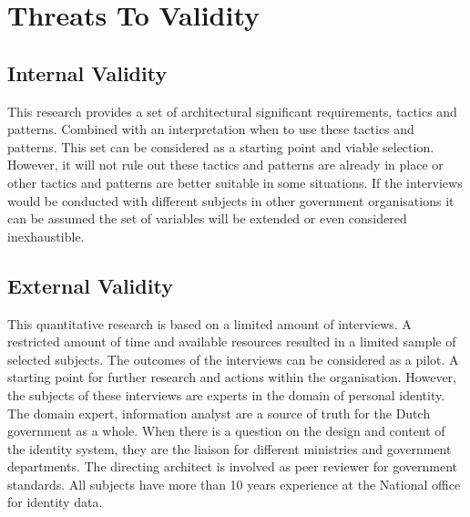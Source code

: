 \chapter{Threats To Validity}\label{sec:threats}


\section{Internal Validity}
This research provides a set of architectural significant requirements, tactics and patterns. Combined with an interpretation when to use these tactics and patterns.
This set can be considered as a starting point and viable selection. However, it will not rule out these tactics and patterns are already in place or other tactics and patterns are better suitable in some situations. If the interviews would be conducted with different subjects in other government organisations it can be assumed the set of variables will be extended or even considered inexhaustible. 

\section{External Validity}
This quantitative research is based on a limited amount of interviews. A restricted amount of time and available resources resulted in a limited sample of selected subjects. The outcomes of the interviews can be considered as a pilot. A starting point for further research and actions within the organisation. 
However, the subjects of these interviews are experts in the domain of personal identity. The domain expert, information analyst  are a source of truth for the Dutch government as a whole. When there is a question on the design and content of the identity system, they are the liaison for different ministries and government departments. The directing architect is involved as peer reviewer for government standards. All subjects have more than 10 years experience at the National office for identity data.  

